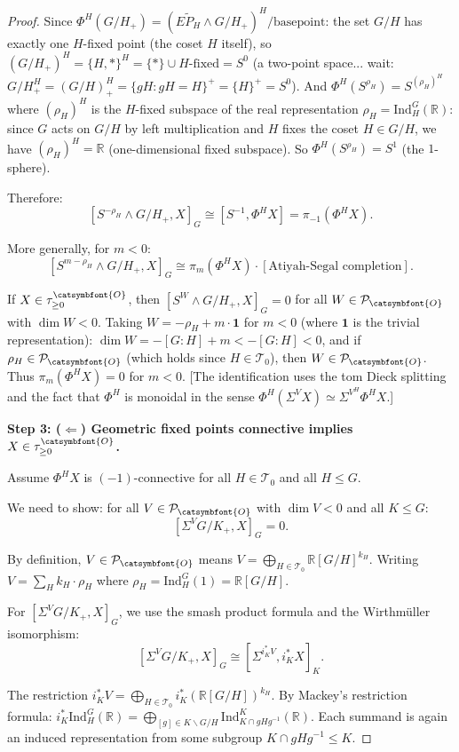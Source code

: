 \documentclass[12pt]{article}
\theoremstyle{definition}
\newcommand{\aO}{{\catsymbfont{O}}}
\begin{document}
\begin{proof}
Since $\Phi^H(G/H_+) = (E\tilde{P}_H\wedge G/H_+)^H / \mathrm{basepoint}$: the set $G/H$ has exactly one $H$-fixed point (the coset $H$ itself), so $(G/H_+)^H = \{H,*\}^H = \{*\} \cup H\text{-fixed} = S^0$ (a two-point space... wait: $G/H_+^H = (G/H)^H_+ = \{gH : gH = H\}^+ = \{H\}^+ = S^0$). And $\Phi^H(S^{\rho_H}) = S^{(\rho_H)^H}$ where $(\rho_H)^H$ is the $H$-fixed subspace of the real representation $\rho_H = \mathrm{Ind}_H^G(\mathbb{R})$: since $G$ acts on $G/H$ by left multiplication and $H$ fixes the coset $H\in G/H$, we have $(\rho_H)^H = \mathbb{R}$ (one-dimensional fixed subspace). So $\Phi^H(S^{\rho_H}) = S^1$ (the $1$-sphere).

Therefore:
$$[S^{-\rho_H}\wedge G/H_+, X]_G \cong [S^{-1}, \Phi^H X] = \pi_{-1}(\Phi^H X).$$

More generally, for $m<0$:
$$[S^{m-\rho_H}\wedge G/H_+, X]_G \cong \pi_m(\Phi^H X) \cdot [\text{Atiyah-Segal completion}].$$

If $X\in\tau_{\geq 0}^{\aO}$, then $[S^W\wedge G/H_+, X]_G = 0$ for all $W\in\mathcal{P}_\aO$ with $\dim W < 0$. Taking $W = -\rho_H + m\cdot\mathbf{1}$ for $m<0$ (where $\mathbf{1}$ is the trivial representation): $\dim W = -[G:H]+m < -[G:H] < 0$, and if $\rho_H\in\mathcal{P}_\aO$ (which holds since $H\in\mathcal{T}_0$), then $W\in\mathcal{P}_\aO$. Thus $\pi_m(\Phi^H X) = 0$ for $m < 0$. [The identification uses the tom Dieck splitting and the fact that $\Phi^H$ is monoidal in the sense $\Phi^H(\Sigma^V X)\simeq\Sigma^{V^H}\Phi^H X$.]

\textbf{Step 3: ($\Leftarrow$) Geometric fixed points connective implies $X\in\tau_{\geq 0}^{\aO}$.}

Assume $\Phi^H X$ is $(-1)$-connective for all $H\in\mathcal{T}_0$ and all $H\leq G$.

We need to show: for all $V\in\mathcal{P}_\aO$ with $\dim V < 0$ and all $K\leq G$:
$$[\Sigma^V G/K_+, X]_G = 0.$$

By definition, $V\in\mathcal{P}_\aO$ means $V = \bigoplus_{H\in\mathcal{T}_0}\mathbb{R}[G/H]^{k_H}$. Writing $V = \sum_H k_H\cdot\rho_H$ where $\rho_H = \mathrm{Ind}_H^G(1) = \mathbb{R}[G/H]$.

For $[\Sigma^V G/K_+, X]_G$, we use the smash product formula and the Wirthm\"uller isomorphism:
$$[\Sigma^V G/K_+, X]_G \cong [\Sigma^{i_K^* V}, i_K^* X]_K.$$

The restriction $i_K^* V = \bigoplus_{H\in\mathcal{T}_0} i_K^*(\mathbb{R}[G/H])^{k_H}$. By Mackey's restriction formula: $i_K^*\mathrm{Ind}_H^G(\mathbb{R}) = \bigoplus_{[g]\in K\backslash G/H}\mathrm{Ind}_{K\cap gHg^{-1}}^K(\mathbb{R})$. Each summand is again an induced representation from some subgroup $K\cap gHg^{-1}\leq K$.


\end{proof}
\end{document}
